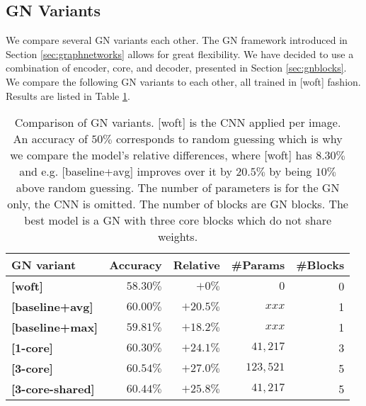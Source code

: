 \subsection{GN Variants}

We compare several GN variants each other. The GN framework introduced in Section \ref{sec:graphnetworks} allows for great flexibility. We have decided to use a combination of encoder, core, and decoder, presented in Section \ref{sec:gnblocks}.
We compare the following GN variants to each other, all trained in [woft] fashion. Results are listed in Table \ref{tab:gnvariantscomparison}.

\begin{table}
    \centering
    \begin{tabular}{lrrrr}
        \textbf{GN variant} & \textbf{Accuracy} & \textbf{Relative} & \textbf{\#Params} & \textbf{\#Blocks}\\\hline
        \textbf{[woft]} & $58.30\%$ & $+0\%$ & $0$ & 0 \\
        \textbf{[baseline+avg]} & $60.00\%$ & $+20.5\%$ & $xxx$ & 1\\
        \textbf{[baseline+max]} & $59.81\%$ & $+18.2\%$ & $xxx$ & 1\\
        \textbf{[1-core]} & $60.30\%$ & $+24.1\%$ & $41,217$ & 3\\
        \textbf{[3-core]} & $\bm{60.54\%}$ & $+27.0\%$ & $123,521$ & 5\\
        \textbf{[3-core-shared]} & $60.44\%$ & $+25.8\%$ & $41,217$ & 5\\
    \end{tabular}
    \caption[Comparison of GN variants]{Comparison of GN variants. [woft] is the CNN applied per image. An accuracy of $50\%$ corresponds to random guessing which is why we compare the model's relative differences, where [woft] has $8.30\%$ and e.g. [baseline+avg] improves over it by $20.5\%$ by being $10\%$ above random guessing. The number of parameters is for the GN only, the CNN is omitted. The number of blocks are GN blocks. The best model is a GN with three core blocks which do not share weights.}
    \label{tab:gnvariantscomparison}
\end{table}

